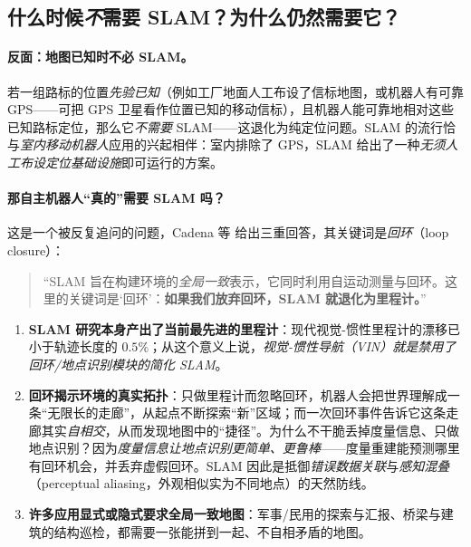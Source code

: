 \subsection{什么时候\texorpdfstring{\emph{不}}{不}需要 SLAM？为什么仍然需要它？}
\label{sec:intro-need}

\paragraph{反面：地图已知时不必 SLAM。}
若一组路标的位置\emph{先验已知}（例如工厂地面人工布设了信标地图，或机器人有可靠 GPS——可把 GPS 卫星看作位置已知的移动信标），且机器人能可靠地相对这些已知路标定位，那么它\emph{不需要} SLAM——这退化为纯定位问题\cite{cadena2016past}。SLAM 的流行恰与\emph{室内移动机器人}应用的兴起相伴：室内排除了 GPS，SLAM 给出了一种\emph{无须人工布设定位基础设施}即可运行的方案。

\paragraph{那自主机器人“真的”需要 SLAM 吗？}
这是一个被反复追问的问题，Cadena 等\cite{cadena2016past} 给出三重回答，其关键词是\emph{回环}（loop closure）：

\begin{quote}
“SLAM 旨在构建环境的\emph{全局一致}表示，它同时利用自运动测量与回环。这里的关键词是‘回环’：\textbf{如果我们放弃回环，SLAM 就退化为里程计。}”\cite{cadena2016past}
\end{quote}

\begin{enumerate}
  \item \textbf{SLAM 研究本身产出了当前最先进的里程计}：现代视觉-惯性里程计的漂移已小于轨迹长度的 $0.5\%$；从这个意义上说，\emph{视觉-惯性导航（VIN）就是禁用了回环/地点识别模块的简化 SLAM}\cite{cadena2016past}。
  \item \textbf{回环揭示环境的真实拓扑}：只做里程计而忽略回环，机器人会把世界理解成一条“无限长的走廊”，从起点不断探索“新”区域；而一次回环事件告诉它这条走廊其实\emph{自相交}，从而发现地图中的“捷径”。为什么不干脆丢掉度量信息、只做地点识别？因为\emph{度量信息让地点识别更简单、更鲁棒}——度量重建能预测哪里有回环机会，并丢弃虚假回环。SLAM 因此是抵御\emph{错误数据关联}与\emph{感知混叠}（perceptual aliasing，外观相似实为不同地点）的天然防线\cite{cadena2016past}。
  \item \textbf{许多应用显式或隐式要求全局一致地图}：军事/民用的探索与汇报、桥梁与建筑的结构巡检，都需要一张能拼到一起、不自相矛盾的地图\cite{cadena2016past}。
\end{enumerate}

